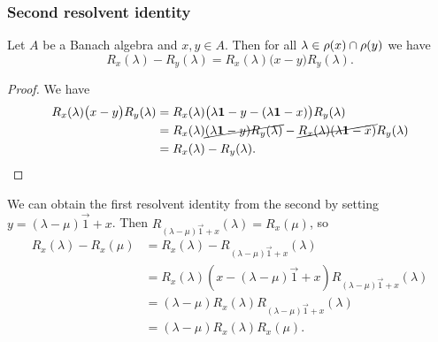 \subsubsection{Second resolvent identity}
\begin{proposition} \label{secondResolventIdentity}
Let $A$ be a Banach algebra and $x,y\in A$. Then for all $\lambda \in \res(x)\cap \res(y)$ we have
\[ R_x(\lambda) - R_y(\lambda) = R_x(\lambda)\big(x-y\big)R_y(\lambda). \]
\end{proposition}
\begin{proof}
We have
\begin{align*}
R_x(\lambda)\big(x-y\big)R_y(\lambda) &= R_x(\lambda)\big(\lambda\vec{1}-y - (\lambda\vec{1} - x)\big)R_y(\lambda) \\
&= R_x(\lambda)\cancel{(\lambda\vec{1}-y)R_y(\lambda)} - \cancel{R_x(\lambda)(\lambda\vec{1} - x)}R_y(\lambda) \\
&= R_x(\lambda) - R_y(\lambda).
\end{align*}
\end{proof}
We can obtain the first resolvent identity from the second by setting $y = (\lambda-\mu)\vec{1} + x$. Then $R_{(\lambda-\mu)\vec{1} + x}(\lambda) = R_x(\mu)$, so
\begin{align*}
R_x(\lambda) - R_x(\mu) &= R_x(\lambda) - R_{(\lambda-\mu)\vec{1} + x}(\lambda) \\
&= R_x(\lambda)(x - (\lambda-\mu)\vec{1} + x)R_{(\lambda-\mu)\vec{1} + x}(\lambda) \\
&= (\lambda - \mu)R_x(\lambda)R_{(\lambda-\mu)\vec{1} + x}(\lambda) \\
&= (\lambda - \mu)R_x(\lambda)R_x(\mu).
\end{align*}

